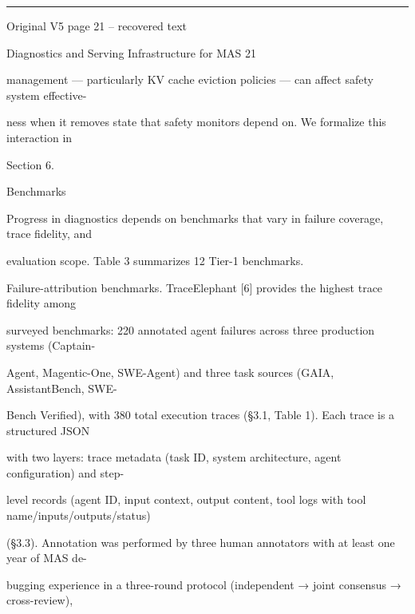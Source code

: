 \par\smallskip\noindent\rule{\textwidth}{0.4pt}\par{\sffamily\footnotesize Original V5 page 21 -- recovered text}\par\begin{flushleft}\footnotesize\ttfamily
\par\smallskip
\par\smallskip
\noindent Diagnostics and Serving Infrastructure for MAS 21\par
\par\smallskip
\par\smallskip
\par\smallskip
\noindent management — particularly KV cache eviction policies — can affect safety system effective-\par
\noindent ness when it removes state that safety monitors depend on. We formalize this interaction in\par
\noindent Section 6.\par
\par\smallskip
{} Benchmarks\par
\noindent Progress in diagnostics depends on benchmarks that vary in failure coverage, trace fidelity, and\par
\noindent evaluation scope. Table 3 summarizes 12 Tier-1 benchmarks.\par
\par\smallskip
\noindent Failure-attribution benchmarks. TraceElephant [6] provides the highest trace fidelity among\par
\noindent surveyed benchmarks: 220 annotated agent failures across three production systems (Captain-\par
\noindent Agent, Magentic-One, SWE-Agent) and three task sources (GAIA, AssistantBench, SWE-\par
\noindent Bench Verified), with 380 total execution traces (§3.1, Table 1). Each trace is a structured JSON\par
\noindent with two layers: trace metadata (task ID, system architecture, agent configuration) and step-\par
\noindent level records (agent ID, input context, output content, tool logs with tool name/inputs/outputs/status)\par
\noindent (§3.3). Annotation was performed by three human annotators with at least one year of MAS de-\par
\noindent bugging experience in a three-round protocol (independent → joint consensus → cross-review),\par

\end{flushleft}
